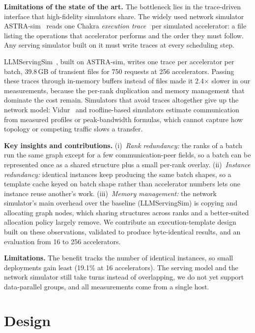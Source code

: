 \documentclass[conference]{IEEEtran}
\begin{document}
\textbf{Limitations of the state of the art.} The bottleneck lies in the
trace-driven interface that high-fidelity simulators share. The widely
used network simulator ASTRA-sim~\cite{astrasim2} reads one Chakra
\emph{execution trace}~\cite{chakra} per simulated accelerator: a file
listing the operations that accelerator performs and the order they must
follow. Any serving simulator built on it must write traces at every
scheduling step.

LLMServingSim~\cite{llmservingsim}, built on ASTRA-sim, writes one trace
per accelerator per batch, 39.8\,GB of transient files for 750 requests
at 256 accelerators. Passing these traces through in-memory buffers
instead of files made it 2.4$\times$ slower in our measurements, because
the per-rank duplication and memory management that dominate the cost
remain. Simulators that avoid traces altogether give up the network
model: Vidur~\cite{vidur} and roofline-based simulators estimate
communication from measured profiles or peak-bandwidth formulas, which
cannot capture how topology or competing traffic slows a transfer.


\textbf{Key insights and contributions.} (i)~\emph{Rank redundancy:} the
ranks of a batch run the same graph except for a few communication-peer
fields, so a batch can be represented once as a shared structure plus a
small per-rank overlay. (ii)~\emph{Instance redundancy:} identical
instances keep producing the same batch shapes, so a template cache keyed
on batch shape rather than accelerator numbers lets one instance reuse
another's work. (iii)~\emph{Memory management:} the network simulator's
main overhead over the baseline (LLMServingSim) is copying and allocating graph nodes,
which sharing structures across ranks and a better-suited allocation
policy largely remove. We contribute an execution-template design built
on these observations, validated to produce byte-identical results, and
an evaluation from 16 to 256 accelerators.


\textbf{Limitations.} The benefit tracks the number of identical
instances, so small deployments gain least (19.1\% at 16 accelerators). The
serving model and the network simulator still take turns instead of
overlapping, we do not yet support data-parallel groups, and all
measurements come from a single host.

\section{Design}
\label{sec:design}
\end{document}
